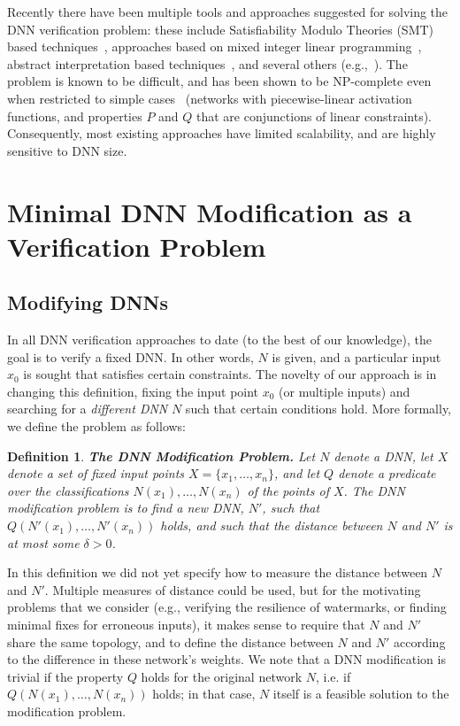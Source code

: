 \documentclass{easychair}
\newtheorem{definition}{Definition}
\begin{document}
Recently there have been multiple tools and approaches suggested for
solving the DNN verification problem: these include Satisfiability
Modulo Theories (SMT) based
techniques~\cite{KaBaDiJuKo17Reluplex,KaHuIbJuLaLiShThWuZeDiKoBa19Marabou},
approaches based on mixed integer linear
programming~\cite{Ehlers2017,TjXiTe19}, abstract interpretation based
techniques~\cite{GeMiDrTsChVe18}, and several others
(e.g.,~\cite{HuKwWaWu17,NaKaRySaWa17}). The problem is known to be
difficult, and has been shown to be NP-complete even when restricted
to simple cases~\cite{KaBaDiJuKo17Reluplex} (networks with
piecewise-linear activation functions, and properties $P$ and $Q$ that
are conjunctions of linear constraints). Consequently, most existing approaches
have limited scalability, and are highly sensitive to DNN size.


\section{Minimal DNN Modification as a Verification Problem}
\label{sec:verifyWatermarks}

\subsection{Modifying DNNs}

In all DNN verification approaches to date (to the best of our
knowledge), the goal is to verify a fixed DNN. In other words, $N$ is
given, and a particular input $x_0$ is sought that satisfies certain constraints.
The novelty of our approach is in changing this definition, fixing
the input point $x_0$ (or multiple inputs) and searching for a
\emph{different DNN} $N$ such that certain conditions hold.
More formally, we define the problem as follows:

\begin{definition}\textbf{The DNN Modification Problem.}
  Let $N$ denote a DNN, let $X$ denote a set of fixed input points
  $X=\{x_1, \ldots, x_n\}$, and let $Q$ denote a predicate over the
  classifications $N(x_1),\ldots,N(x_n)$ of the points of $X$. The
  \emph{DNN modification problem} is to find a new DNN, $N'$, such that
  $Q(N'(x_1),\ldots,N'(x_n))$ holds, and such that the distance
  between $N$ and $N'$ is at most some $\delta>0$.
\end{definition}

In this definition we did not yet specify how to measure the distance
between $N$ and $N'$. Multiple measures of distance could be used, but for the
motivating problems that we consider (e.g., verifying the resilience
of watermarks, or finding minimal fixes for erroneous inputs), it
makes sense to require that $N$ and $N'$ share the same topology, and
to define the distance between $N$ and $N'$ according to the
difference in these network's weights. We note that a DNN modification
is trivial if the property $Q$ holds for the original network $N$,
i.e. if $Q(N(x_1),\ldots,N(x_n))$ holds; in that case, $N$ itself is a
feasible solution to the modification problem.
\end{document}

